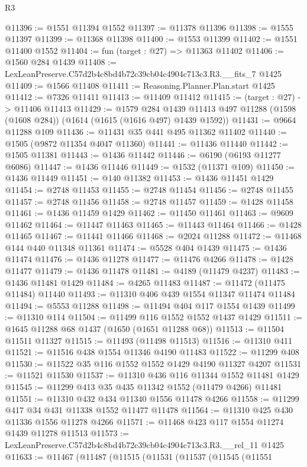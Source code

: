 \begin{lexlean}{R3}
\begin{coremodule}
@11396 := @1551 @11394 @1552
@11397 := @11378 @11396
@11398 := @1555 @11397
@11399 := @11368 @11398
@11400 := @1553 @11399
@11402 := @1551 @11400 @1552
@11404 := fun (target : @27) => @11363 @11402
@11406 := @1560 @284 @1439
@11408 := LexLeanPreserve.C57d2b4c8bd4b72c39cb04c4904c713c3.R3.__fits_7 @1425
@11409 := @1566 @11408
@11411 := Reasoning.Planner.Plan.start @1425
@11412 := @7326 @11411
@11413 := @11409 @11412
@11415 := (target : @27) -> @11406 @11413
@11429 := @1579
    @284
    @1439
    @11413
    @497
    @11288
    (@1598 (@1608 @284))
    (@1614 (@1615 (@1616 @497) @1439 @1592))
@11431 := @9664 @11288 @109
@11436 := @11431 @35 @441 @495 @11362 @11402
@11440 := @1505 (@9872 @11354 @4047 @11360)
@11441 := @11436 @11440
@11442 := @1505 @11381
@11443 := @1436 @11442
@11446 := @6190 (@6193 @11277 @6086)
@11447 := @1436 @11446
@11449 := @1532 (@11371 @109)
@11450 := @1436 @11449
@11451 := @140 @11382
@11453 := @1436 @11451 @1429
@11454 := @2748 @11453
@11455 := @2748 @11454
@11456 := @2748 @11455
@11457 := @2748 @11456
@11458 := @2748 @11457
@11459 := @1428 @11458
@11461 := @1436 @11459 @1429
@11462 := @11450 @11461
@11463 := @9609 @11462
@11464 := @11447 @11463
@11465 := @11443 @11464
@11466 := @1428 @11465
@11467 := @11441 @11466
@11468 := @2024 @11288
@11472 := @11468 @144 @440 @11348 @11361
@11474 := @5528 @404 @1439
@11475 := @1436 @11474
@11476 := @1436 @11278
@11477 := @11476 @4266
@11478 := @1428 @11477
@11479 := @1436 @11478
@11481 := @4189 (@11479 @4237)
@11483 := @1436 @11481 @1429
@11484 := @4265 @11483
@11487 := @11472 (@11475 @11484) @11440
@11493 := @11310 @406 @439 @1554 @11347 @11474 @11484
@11494 := @5553 @11288
@11498 := @11494 @404 @117 @1554 @1439
@11499 := @11310 @114
@11504 := @11499 @116 @1552 @1552 @1437 @1429
@11511 := @1645 @11288 @68 @1437 (@1650 (@1651 @11288 @68))
@11513 := @11504 @11511 @11327
@11515 := @11493 (@11498 @11513)
@11516 := @11310 @411
@11521 := @11516 @438 @1554 @11346 @4190 @11483
@11522 := @11299 @408
@11530 := @11522 @35 @116 @1552 @1552 @1429 @4190 @11327 @4207
@11531 := @11521 @11530
@11537 := @11310 @436 @116 @11344 @1552 @11481 @1429
@11545 := @11299 @413 @35 @435 @11342 @1552 (@11479 @4266) @11481
@11551 := @11310 @432 @434 @11340 @1556 @11478 @4266
@11558 := @11299 @417 @34 @431 @11338 @1552 @11477 @11478
@11564 := @11310 @425 @430 @11336 @1556 @11278 @4266
@11571 := @11468 @423 @117 @1554 @11274 @1439 @11278 @11513
@11573 := LexLeanPreserve.C57d2b4c8bd4b72c39cb04c4904c713c3.R3.__rel_11 @1425
@11633 := @11467
    (@11487
      (@11515
        (@11531
          (@11537
            (@11545
              (@11551

\end{coremodule}
\end{lexlean}
